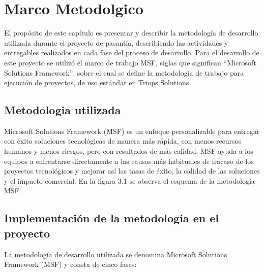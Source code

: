\chapter{Marco Metodolgico} \label{chap:Marco Metodologico}

\vspace{5 mm}

		El propósito de este capítulo es presentar y describir la metodología de desarrollo utilizada durante el proyecto de pasantía, describiendo las actividades y entregables realizados en cada fase del proceso de desarrollo. Para el desarrollo de este proyecto se utilizó el marco de trabajo MSF, siglas que significan “Microsoft Solutions Framework”, sobre el cual se define la metodología de trabajo para ejecución de proyectos, de uso estándar en Triops Solutions.

\section{Metodologia utilizada} \label{sect:Metodologia utilizada}
		Microsoft Solutions Framework (MSF) es un enfoque personalizable para entregar con éxito soluciones tecnológicas de manera más rápida, con menos recursos humanos y menos riesgos, pero con resultados de más calidad. MSF ayuda a los equipos a enfrentarse directamente a las causas más habituales de fracaso de los proyectos tecnológicos y mejorar así las tasas de éxito, la calidad de las soluciones y el impacto comercial. En la figura 3.1 se observa el esquema de la metodología MSF.

\section{Implementación de la metodologia en el proyecto} \label{sect:Implementacion de la metodologia en el proyecto}
		La metodología de desarrollo utilizada se denomina Microsoft Solutions Framework (MSF) y consta de cinco fases:

